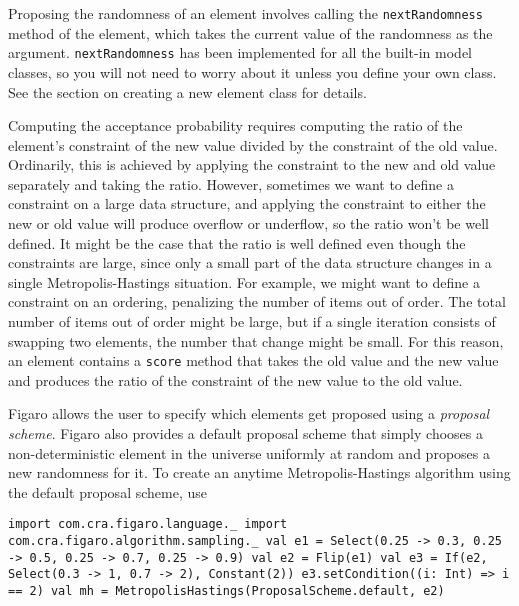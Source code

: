 Proposing the randomness of an element involves calling the \texttt{next\-Randomness} method of the element, which takes the current value of the randomness as the argument. \texttt{nextRandomness} has been implemented for all the built-in model classes, so you will not need to worry about it unless you define your own class. See the section on creating a new element class for details.

Computing the acceptance probability requires computing the ratio of the element's constraint of the new value divided by the constraint of the old value. Ordinarily, this is achieved by applying the
constraint to the new and old value separately and taking the ratio. However, sometimes we want to define a constraint on a large data structure, and applying the constraint to either the new or old value will produce overflow or underflow, so the ratio won't be well defined. It might be the case that the ratio is well defined even though the constraints are large, since only a small part of the data structure changes in a single Metropolis-Hastings situation. For example, we might want to define a constraint on an ordering, penalizing the number of items out of order. The total number of items out of order might be large, but if a single iteration consists of swapping two elements, the number that change might be small. For this reason, an element contains a \texttt{score} method that takes the old value and the new value and produces the ratio of the constraint of the new value to the old value.

Figaro allows the user to specify which elements get proposed using a \emph{proposal scheme}. Figaro also provides a default proposal scheme that simply chooses a non-deterministic element in the universe uniformly at random and proposes a new randomness for it. To create an anytime Metropolis-Hastings algorithm using the default proposal scheme, use

\begin{flushleft}
\texttt{import com.cra.figaro.language.\_
\newline import com.cra.figaro.algorithm.sampling.\_
\newline 
\newline val e1 = Select(0.25 -> 0.3, 0.25 -> 0.5, 0.25 -> 0.7, 0.25 -> 0.9)
\newline val e2 = Flip(e1)
\newline val e3 = If(e2, Select(0.3 -> 1, 0.7 -> 2), Constant(2))
\newline e3.setCondition((i: Int) => i == 2)
\newline 
\newline val mh = MetropolisHastings(ProposalScheme.default, e2)
}
\end{flushleft}

